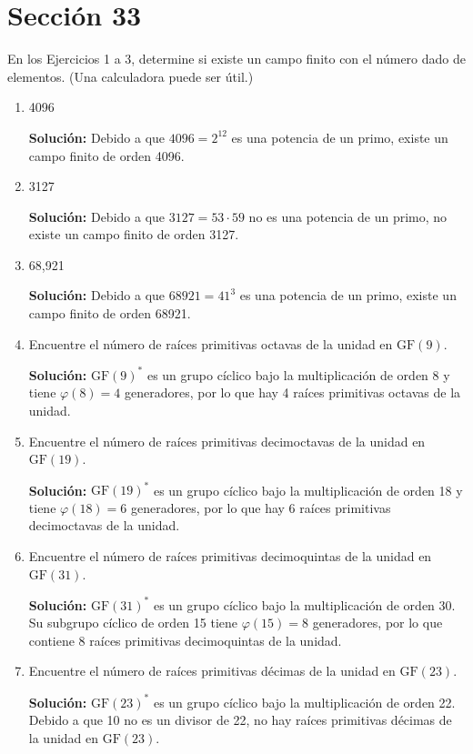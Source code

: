 \section*{Sección 33}

\noindent En los Ejercicios 1 a 3, determine si existe un campo finito con el número dado de elementos. (Una calculadora puede ser útil.)
\begin{enumerate}
    \item 4096
    
    \textbf{Solución:} Debido a que $4096 = 2^{12}$ es una potencia de un primo, existe un campo finito de orden 4096.

    \item 3127
    
    \textbf{Solución:} Debido a que $3127 = 53 \cdot 59$ no es una potencia de un primo, no existe un campo finito de orden 3127.

    \item 68,921
    
    \textbf{Solución:} Debido a que $68921 = 41^3$ es una potencia de un primo, existe un campo finito de orden 68921.

    \item Encuentre el número de raíces primitivas octavas de la unidad en $\text{GF}(9)$.
    
    \textbf{Solución:} $\text{GF}(9)^*$ es un grupo cíclico bajo la multiplicación de orden 8 y tiene $\varphi(8) = 4$ generadores, por lo que hay 4 raíces primitivas octavas de la unidad.

    \item Encuentre el número de raíces primitivas decimoctavas de la unidad en $\text{GF}(19)$.
    
    \textbf{Solución:} $\text{GF}(19)^*$ es un grupo cíclico bajo la multiplicación de orden 18 y tiene $\varphi(18) = 6$ generadores, por lo que hay 6 raíces primitivas decimoctavas de la unidad.

    \item Encuentre el número de raíces primitivas decimoquintas de la unidad en $\text{GF}(31)$.
    
    \textbf{Solución:} $\text{GF}(31)^*$ es un grupo cíclico bajo la multiplicación de orden 30. Su subgrupo cíclico de orden 15 tiene $\varphi(15) = 8$ generadores, por lo que contiene 8 raíces primitivas decimoquintas de la unidad.

    \item Encuentre el número de raíces primitivas décimas de la unidad en $\text{GF}(23)$.
    
    \textbf{Solución:} $\text{GF}(23)^*$ es un grupo cíclico bajo la multiplicación de orden 22. Debido a que 10 no es un divisor de 22, no hay raíces primitivas décimas de la unidad en $\text{GF}(23)$.
\end{enumerate}


